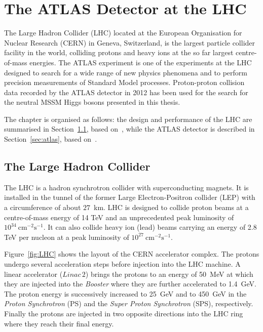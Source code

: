 \chapter{The ATLAS Detector at the LHC}\label{chap:detector}
 \vspace{0.5cm}

The Large Hadron Collider (LHC) located at the European Organisation for Nuclear Research (CERN) in Geneva, Switzerland,
is  the largest particle collider facility in the world, colliding protons and heavy ions at the so far largest centre-of-mass
energies. The ATLAS experiment is one of the experiments at the LHC designed  to search for  a wide range of new 
physics phenomena and to perform  precision measurements of Standard Model processes.
Proton-proton collision data recorded by the ATLAS detector in 2012  has been used for 
the search for the neutral MSSM Higgs bosons presented in this thesis.

The chapter is organised as follows: the design and performance of the LHC  are summarised in 
Section~\ref{sec:lhc}, based on~\cite{LHC},  while  the  ATLAS detector  is 
described in Section~\ref{sec:atlas}, based on~\cite{ATLASDetector}.


\restoregeometry
\clearpage



\section{The Large Hadron Collider}\label{sec:lhc}
The LHC is a hadron synchrotron  collider with superconducting magnets. 
It is  installed in the tunnel of the former Large Electron-Positron collider (LEP)
with a circumference of about $27$~km.
LHC is designed to collide proton beams at a  centre-of-mass energy of 14 TeV and an unprecedented peak luminosity of 
$10^{34} ~ \text{cm}^{-2} \text{s}^{-1}$. It can also collide heavy ion (lead) beams carrying  an energy of 2.8 TeV per nucleon at
a peak luminosity of $10^{27} ~ \text{cm}^{-2} \text{s}^{-1}$. 

Figure~\ref{fig:LHC} shows the layout of the CERN accelerator complex. The  protons undergo several acceleration steps before 
injection into the LHC machine.
A linear  accelerator ($Linac\,2$) brings the protons to an energy of 50~MeV at  which
they are injected into the \emph{Booster} where they are  further  accelerated
to 1.4~GeV. The proton energy is successively increased to 25~GeV and to 450~GeV in the \emph{Proton Synchrotron} (PS)
and the \emph{Super Proton Synchrotron} (SPS), respectively. Finally the protons are  injected in two
opposite directions into the LHC ring where they reach their final energy.

